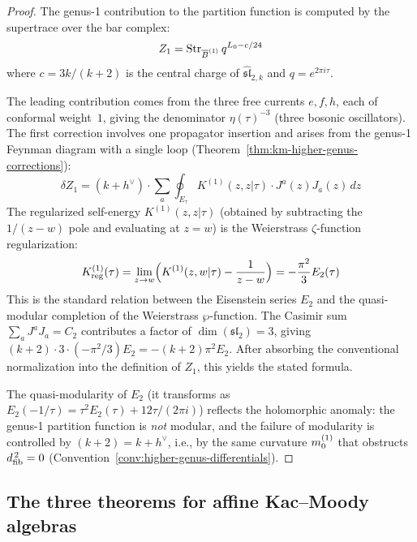 \begin{proof}
The genus-1 contribution to the partition function is computed by the supertrace over the bar complex:
\begin{equation}
Z_1 = \operatorname{Str}_{\overline{B}^{(1)}} q^{L_0 - c/24}
\end{equation}
where $c = 3k/(k+2)$ is the central charge of $\widehat{\mathfrak{sl}}_{2,k}$ and $q = e^{2\pi i \tau}$.

The leading contribution comes from the three free currents $e, f, h$, each of conformal weight~$1$, giving the denominator $\eta(\tau)^{-3}$ (three bosonic oscillators).  The first correction involves one propagator insertion and arises from the genus-1 Feynman diagram with a single loop (Theorem~\ref{thm:km-higher-genus-corrections}):
\begin{equation}
\delta Z_1 = (k+h^\vee) \cdot \sum_{a} \oint_{E_\tau} K^{(1)}(z,z|\tau) \cdot J^a(z) J_a(z)\, dz
\end{equation}
The regularized self-energy $K^{(1)}(z,z|\tau)$ (obtained by subtracting the $1/(z-w)$ pole and evaluating at $z=w$) is the Weierstrass $\zeta$-function regularization:
\begin{equation}
K^{(1)}_{\mathrm{reg}}(\tau) = \lim_{z \to w}\Bigl(K^{(1)}(z,w|\tau) - \frac{1}{z-w}\Bigr) = -\frac{\pi^2}{3} E_2(\tau)
\end{equation}
This is the standard relation between the Eisenstein series $E_2$ and the quasi-modular completion of the Weierstrass $\wp$-function.  The Casimir sum $\sum_a J^a J_a = C_2$ contributes a factor of $\dim(\mathfrak{sl}_2) = 3$, giving $(k+2) \cdot 3 \cdot (-\pi^2/3) E_2 = -(k+2)\pi^2 E_2$.  After absorbing the conventional normalization into the definition of $Z_1$, this yields the stated formula.

The quasi-modularity of $E_2$ (it transforms as $E_2(-1/\tau) = \tau^2 E_2(\tau) + 12\tau/(2\pi i)$) reflects the holomorphic anomaly: the genus-1 partition function is \emph{not} modular, and the failure of modularity is controlled by $(k+2) = k + h^\vee$, i.e., by the same curvature $m_0^{(1)}$ that obstructs $d_{\mathrm{fib}}^{\,2} = 0$ (Convention~\ref{conv:higher-genus-differentials}).
\end{proof}

\subsection{The three theorems for affine Kac--Moody algebras}

